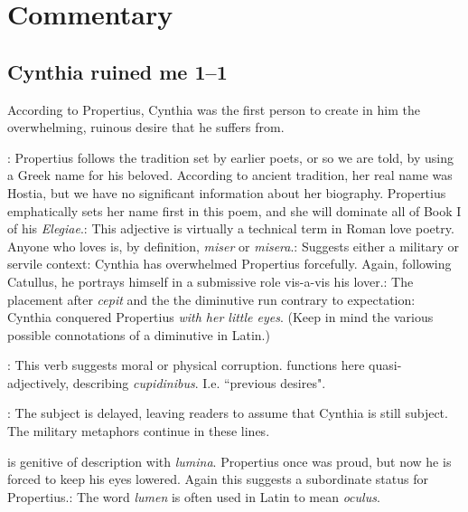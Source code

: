 \chapter*{Commentary}

\section*{Cynthia ruined me 1--1}

According to Propertius, Cynthia was the first person to create in him the overwhelming, ruinous desire that he suffers from.


: Propertius follows the tradition set by earlier poets, or so we are told, by using a Greek name for his beloved.  According to ancient tradition, her real name was Hostia, but we have no significant information about her biography.  Propertius emphatically sets her name first in this poem, and she will dominate all of Book I of his \textit{Elegiae}.\indent{}: This adjective is virtually a technical term in Roman love poetry.  Anyone who loves is, by definition, \textit{miser} or \textit{misera}.\indent{}: Suggests either a military or servile context: Cynthia has overwhelmed Propertius forcefully. Again, following Catullus, he portrays himself in a submissive role vis-a-vis his lover.\indent{}: The placement after \textit{cepit} and the the diminutive run contrary to expectation: Cynthia conquered Propertius \textit{with her little eyes}.  (Keep in mind the various possible connotations of a diminutive in Latin.)


: This verb suggests moral or physical corruption.\indent{} functions here quasi-adjectively, describing \textit{cupidinibus}.  I.e. ``previous desires".


: The subject is delayed, leaving readers to assume that Cynthia is still subject.  The military metaphors continue in these lines.


 is genitive of description with \textit{lumina}.  Propertius once was proud, but now he is forced to keep his eyes lowered.  Again this suggests a subordinate status for Propertius.\indent{}: The word \textit{lumen} is often used in Latin to mean \textit{oculus}.

